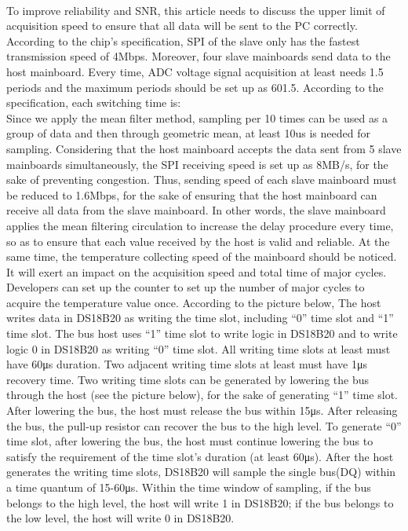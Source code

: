 \\
To improve reliability and SNR, this article needs to discuss the upper limit of acquisition speed to ensure that all data will be sent to the PC correctly. 
\\
According to the chip’s specification, SPI of the slave only has the fastest transmission speed of 4Mbps. Moreover, four slave mainboards send data to the host mainboard. Every time, ADC voltage signal acquisition at least needs 1.5 periods and the maximum periods should be set up as 601.5. According to the specification, each switching time is: 
\\
Since we apply the mean filter method, sampling per 10 times can be used as a group of data and then through geometric mean, at least 10us is needed for sampling. 
Considering that the host mainboard accepts the data sent from 5 slave mainboards simultaneously, the SPI receiving speed is set up as 8MB/s, for the sake of preventing congestion. 
Thus, sending speed of each slave mainboard must be reduced to 1.6Mbps, for the sake of ensuring that the host mainboard can receive all data from the slave mainboard. 
In other words, the slave mainboard applies the mean filtering circulation to increase the delay procedure every time, so as to ensure that each value received by the host is valid and reliable. 
At the same time, the temperature collecting speed of the mainboard should be noticed. It will exert an impact on the acquisition speed and total time of major cycles. Developers can set up the counter to set up the number of major cycles to acquire the temperature value once. According to the picture below, 
The host writes data in DS18B20 as writing the time slot, including “0” time slot and “1” time slot. The bus host uses “1” time slot to write logic in DS18B20 and to write logic 0 in DS18B20 as writing “0” time slot. All writing time slots at least must have 60μs duration. Two adjacent writing time slots at least must have 1μs recovery time. Two writing time slots can be generated by lowering the bus through the host (see the picture below), for the sake of generating “1” time slot. 
After lowering the bus, the host must release the bus within 15μs. After releasing the bus, the pull-up resistor can recover the bus to the high level. To generate “0” time slot, after lowering the bus, the host must continue lowering the bus to satisfy the requirement of the time slot’s duration (at least 60μs). 
After the host generates the writing time slots, DS18B20 will sample the single bus(DQ) within a time quantum of 15-60μs. Within the time window of sampling, if the bus belongs to the high level, the host will write 1 in DS18B20; if the bus belongs to the low level, the host will write 0 in DS18B20. 
